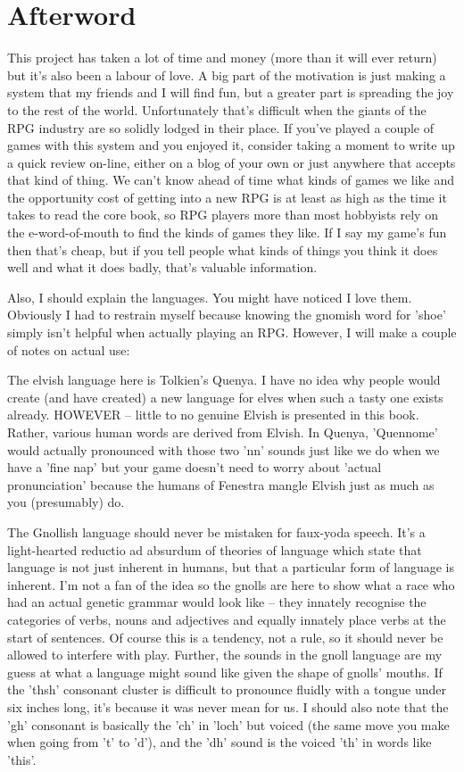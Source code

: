 \section*{Afterword}

This project has taken a lot of time and money (more than it will ever return) but it's also been a labour of love.  A big part of the motivation is just making a system that my friends and I will find fun, but a greater part is spreading the joy to the rest of the world.  Unfortunately that's difficult when the giants of the RPG industry are so solidly lodged in their place.  If you've played a couple of games with this system and you enjoyed it, consider taking a moment to write up a quick review on-line, either on a blog of your own or just anywhere that accepts that kind of thing.  We can't know ahead of time what kinds of games we like and the opportunity cost of getting into a new RPG is at least as high as the time it takes to read the core book, so RPG players more than most hobbyists rely on the e-word-of-mouth to find the kinds of games they like.  If I say my game's fun then that's cheap, but if you tell people what kinds of things you think it does well and what it does badly, that's valuable information.

	Also, I should explain the languages.  You might have noticed I love them.  Obviously I had to restrain myself because knowing the gnomish word for 'shoe' simply isn't helpful when actually playing an RPG.  However, I will make a couple of notes on actual use:

	The elvish language here is Tolkien's Quenya.  I have no idea why people would create (and have created) a new language for elves when such a tasty one exists already.  HOWEVER -- little to no genuine Elvish is presented in this book.  Rather, various human words are derived from Elvish.  In Quenya, 'Quennome' would actually pronounced with those two 'nn' sounds just like we do when we have a 'fine nap' but your game doesn't need to worry about 'actual pronunciation' because the humans of Fenestra mangle Elvish just as much as you (presumably) do.

	The Gnollish language should never be mistaken for faux-yoda speech.  It's a light-hearted reductio ad absurdum of theories of language which state that language is not just inherent in humans, but that a particular form of language is inherent.  I'm not a fan of the idea so the gnolls are here to show what a race who had an actual genetic grammar would look like -- they innately recognise the categories of verbs, nouns and adjectives and equally innately place verbs at the start of sentences.  Of course this is a tendency, not a rule, so it should never be allowed to interfere with play.  Further, the sounds in the gnoll language are my guess at what a language might sound like given the shape of gnolls' mouths.  If the 'thsh' consonant cluster is difficult to pronounce fluidly with a tongue under six inches long, it's because it was never mean for us. I should also note that the 'gh' consonant is basically the 'ch' in 'loch' but voiced (the same move you make when going from 't' to 'd'), and the 'dh' sound is the voiced 'th' in words like 'this'.

